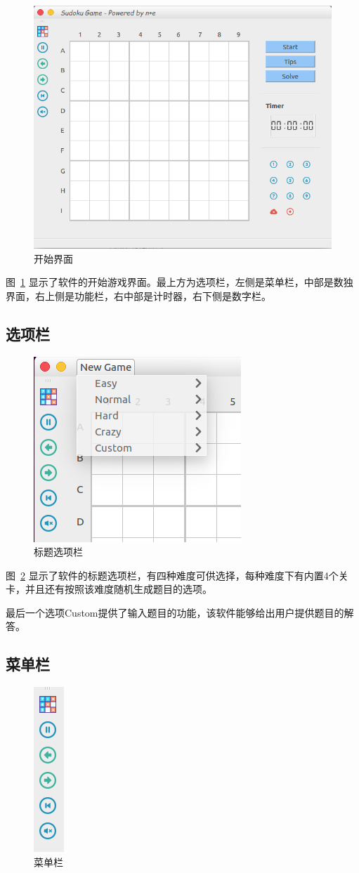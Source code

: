 \documentclass[a4paper]{article}
\begin{document}
\begin{figure}[htp]
\centering
\includegraphics[width=0.7\linewidth]{start.png}
\caption{开始界面}
\label{fig:start}
\end{figure}

图~\ref{fig:start} 显示了软件的开始游戏界面。最上方为选项栏，左侧是菜单栏，中部是数独界面，右上侧是功能栏，右中部是计时器，右下侧是数字栏。

\subsection{选项栏}
\begin{figure}[htp]
\centering
\includegraphics[width=0.5\linewidth]{title.png}
\caption{标题选项栏}
\label{fig:title}
\end{figure}

图~\ref{fig:title} 显示了软件的标题选项栏，有四种难度可供选择，每种难度下有内置4个关卡，并且还有按照该难度随机生成题目的选项。

最后一个选项Custom提供了输入题目的功能，该软件能够给出用户提供题目的解答。
\subsection{菜单栏}
\begin{figure}[htp]
\centering
\includegraphics[width=0.05\linewidth]{menubar.png}
\caption{菜单栏}
\label{fig:menu}
\end{figure}
\end{document}
